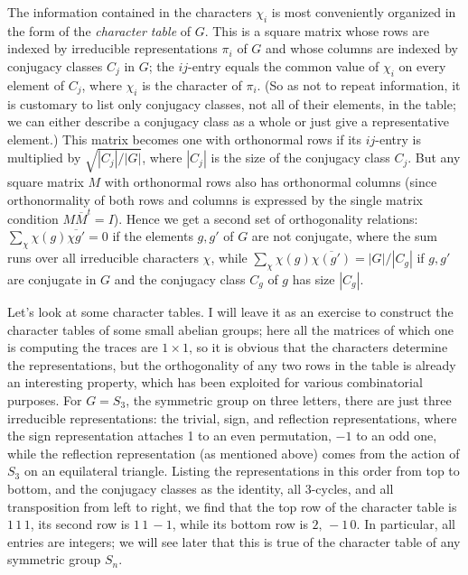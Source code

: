 \documentclass[10pt]{article}
\begin{document}
The information contained in the characters $\chi_i$ is most
conveniently organized in the form of the {\sl character table} of $G$.
This is a square matrix whose rows are indexed by irreducible
representations $\pi_i$ of $G$ and whose columns are indexed by
conjugacy classes $C_j$ in $G$; the $ij$-entry equals the common value
of $\chi_i$ on every element of $C_j$, where $\chi_i$ is the character
of $\pi_i$. (So as not to repeat information, it is customary to list
only conjugacy classes, not all of their elements, in the table; we can
either describe a conjugacy class as a whole or just give a
representative element.) This matrix becomes one with orthonormal rows
if its $ij$-entry is multiplied by $\sqrt{| C_j |/| G |}$, where $| C_j
|$ is the size of the conjugacy class $C_j$. But any square matrix $M$
with orthonormal rows also has orthonormal columns (since orthonormality
of both rows and columns is expressed by the single matrix condition $M
\overline{M}^t = I$). Hence we get a second set of orthogonality
relations: $\sum_{\chi} \chi(g)\overline{\chi{g'}} = 0$ if the elements
$g,g'$ of $G$ are not conjugate, where the sum runs over all irreducible
characters $\chi$, while $\sum_{\chi} \chi(g)\overline{\chi(g')} = | G
|/| C_g |$ if $g,g'$ are conjugate in $G$ and the conjugacy class $C_g$
of $g$ has size $| C_g |$.

Let's look at some character tables. I will leave it as an exercise to
construct the character tables of some small abelian groups; here all
the matrices of which one is computing the traces are $1\times 1$, so it
is obvious that the characters determine the representations, but the
orthogonality of any two rows in the table is already an interesting
property, which has been exploited for various combinatorial purposes.
For $G = S_3$, the symmetric group on three letters, there are just
three irreducible representations: the trivial, sign, and reflection
representations, where the sign representation attaches 1 to an even
permutation, $-1$ to an odd one, while the reflection representation (as
mentioned above) comes from the action of $S_3$ on an equilateral
triangle. Listing the representations in this order from top to bottom,
and the conjugacy classes as the identity, all 3-cycles, and all
transposition from left to right, we find that the top row of the
character table is $1\,1\,1$, its second row is $1\,1\,-1$, while its
bottom row is $2,\,-1\,0$. In particular, all entries are integers; we
will see later that this is true of the character table of any symmetric
group $S_n$.
\end{document}

